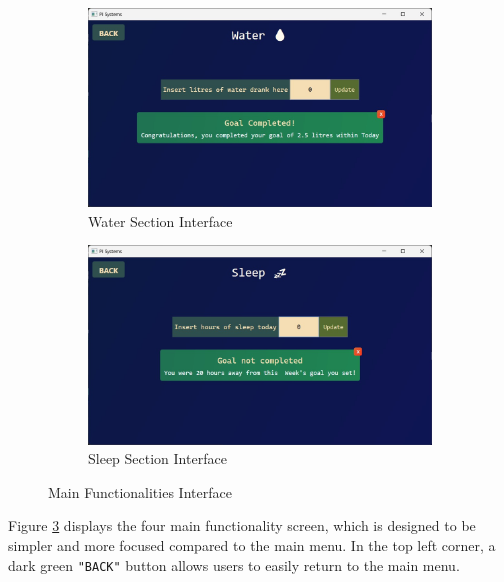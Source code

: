 \documentclass[12pt]{article}
\begin{document}
\begin{figure}[!ht]
  \begin{subfigure}{0.4\linewidth}
    \includegraphics[width = \linewidth]{Water Screen}
    \caption{Water Section Interface}
    \label{fig:Water}
  \end{subfigure}%
  \hfill
  \begin{subfigure}{0.4\linewidth}
    \includegraphics[width = \linewidth]{Sleep Screen}
    \caption{Sleep Section Interface}
    \label{fig:Sleep}
  \end{subfigure}

  \caption{Main Functionalities Interface}
  \label{fig:Main}
\end{figure}



Figure \ref{fig:Main} displays the four main functionality screen, which is designed
to be simpler and more focused compared to the main menu. In the top left corner, a 
dark green \texttt{"BACK"} button allows users to easily return to the main menu.\par 
\end{document}
